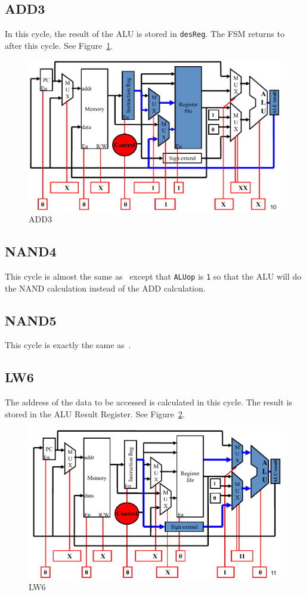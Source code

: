 \documentclass[a4paper]{article}
\begin{document}
\subsection{ADD3}\label{add3}
In this cycle, the result of the ALU is stored in \verb|desReg|. The FSM returns to~ after this cycle.
See Figure~\ref{fig:add3}.
\begin{figure}[ht!]
    \center
    \includegraphics[scale=0.4]{add3}
    \caption{ADD3}\label{fig:add3}
\end{figure}

\subsection{NAND4}
This cycle is almost the same as~ except that \verb|ALUop| is \verb|1| so that the ALU will do the NAND calculation
instead of the ADD calculation.

\subsection{NAND5}
This cycle is exactly the same as~.

\subsection{LW6}
The address of the data to be accessed is calculated in this cycle. The result is stored in the ALU Result Register.
See Figure~\ref{fig:lw6}.
\begin{figure}[ht!]
    \center
    \includegraphics[scale=0.4]{lw6}
    \caption{LW6}\label{fig:lw6}
\end{figure}
\end{document}
